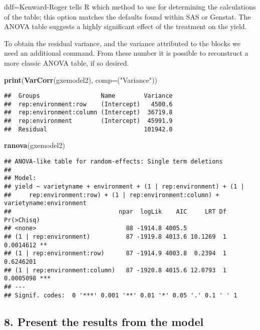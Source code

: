 \documentclass[]{book}
\newenvironment{Shaded}{\begin{snugshade}}{\end{snugshade}}
\newcommand{\KeywordTok}[1]{\textcolor[rgb]{0.13,0.29,0.53}{\textbf{#1}}}
\newcommand{\DataTypeTok}[1]{\textcolor[rgb]{0.13,0.29,0.53}{#1}}
\newcommand{\StringTok}[1]{\textcolor[rgb]{0.31,0.60,0.02}{#1}}
\newcommand{\NormalTok}[1]{#1}
\theoremstyle{definition}
\theoremstyle{definition}
\theoremstyle{definition}
\theoremstyle{remark}
\begin{document}
ddf=Kenward-Roger tells R which method to use for determining the
calculations of the table; this option matches the defaults found within
SAS or Genstat. The ANOVA table suggests a highly significant effect of
the treatment on the yield.

To obtain the residual variance, and the variance attributed to the
blocks we need an additional command. From these number it is possible
to reconstruct a more classic ANOVA table, if so desired.

\begin{Shaded}
\begin{Highlighting}[]
\KeywordTok{print}\NormalTok{(}\KeywordTok{VarCorr}\NormalTok{(gxemodel2), }\DataTypeTok{comp=}\NormalTok{(}\StringTok{"Variance"}\NormalTok{))}
\end{Highlighting}
\end{Shaded}

\begin{verbatim}
##  Groups                 Name        Variance
##  rep:environment:row    (Intercept)   4500.6
##  rep:environment:column (Intercept)  36719.8
##  rep:environment        (Intercept)  45991.9
##  Residual                           101942.0
\end{verbatim}

\begin{Shaded}
\begin{Highlighting}[]
\KeywordTok{ranova}\NormalTok{(gxemodel2)}
\end{Highlighting}
\end{Shaded}

\begin{verbatim}
## ANOVA-like table for random-effects: Single term deletions
## 
## Model:
## yield ~ varietyname + environment + (1 | rep:environment) + (1 | 
##     rep:environment:row) + (1 | rep:environment:column) + varietyname:environment
##                              npar  logLik    AIC     LRT Df Pr(>Chisq)    
## <none>                         88 -1914.8 4005.5                          
## (1 | rep:environment)          87 -1919.8 4013.6 10.1269  1  0.0014612 ** 
## (1 | rep:environment:row)      87 -1914.9 4003.8  0.2394  1  0.6246201    
## (1 | rep:environment:column)   87 -1920.8 4015.6 12.0793  1  0.0005098 ***
## ---
## Signif. codes:  0 '***' 0.001 '**' 0.01 '*' 0.05 '.' 0.1 ' ' 1
\end{verbatim}

\subsection{8. Present the results from the
model}\label{present-the-results-from-the-model-4}
\end{document}
